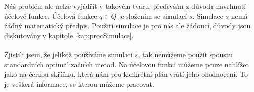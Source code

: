 Náš problém ale nelze vyjádřit v takovém tvaru, především z důvodu navrhnutí účelové funkce.
Účelová funkce $q \in Q$ je složením se simulací $s$. Simulace $s$ nemá žádný matematický předpis.
Použití simulace je pro nás ale žádoucí, důvody jsou diskutovány v kapitole \ref{kap:procSimulace}.
\\
\\
Zjistili jsem, že jelikož používáme simulaci $s$, tak nemůžeme použít spoustu standardních optimalizačních metod.
Na účelovou funkci můžeme pouze nahlížet jako na černou skříňku, která nám pro konkrétní plán vrátí jeho ohodnocení. 
To je veškerá informace, se kterou můžeme pracovat.

